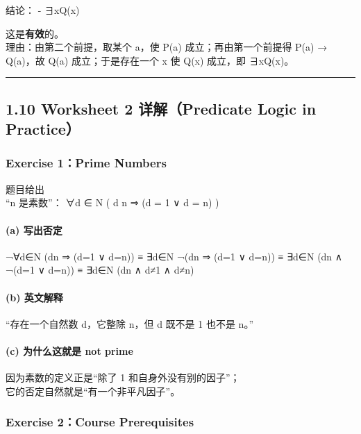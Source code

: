 \documentclass[
  11pt,
]{article}
\begin{document}
结论： - ∃xQ(x)

这是\textbf{有效}的。\\
理由：由第二个前提，取某个 a，使 P(a) 成立；再由第一个前提得 P(a) →
Q(a)，故 Q(a) 成立；于是存在一个 x 使 Q(x) 成立，即 ∃xQ(x)。

\begin{center}\rule{0.5\linewidth}{0.5pt}\end{center}

\subsection{1.10 Worksheet 2 详解（Predicate Logic in
Practice）}\label{worksheet-2-ux8be6ux89e3predicate-logic-in-practice}

\subsubsection{Exercise 1：Prime Numbers}\label{exercise-1prime-numbers}

题目给出\\
``n 是素数''： ∀d ∈ N ( d \textbar{} n ⇒ (d = 1 ∨ d = n) )

\paragraph{(a) 写出否定}\label{a-ux5199ux51faux5426ux5b9a}

¬∀d∈N (d\textbar n ⇒ (d=1 ∨ d=n)) ≡ ∃d∈N ¬(d\textbar n ⇒ (d=1 ∨ d=n)) ≡
∃d∈N (d\textbar n ∧ ¬(d=1 ∨ d=n)) ≡ ∃d∈N (d\textbar n ∧ d≠1 ∧ d≠n)

\paragraph{(b) 英文解释}\label{b-ux82f1ux6587ux89e3ux91ca}

``存在一个自然数 d，它整除 n，但 d 既不是 1 也不是 n。''

\paragraph{(c) 为什么这就是 not
prime}\label{c-ux4e3aux4ec0ux4e48ux8fd9ux5c31ux662f-not-prime}

因为素数的定义正是``除了 1 和自身外没有别的因子''；\\
它的否定自然就是``有一个非平凡因子''。

\subsubsection{Exercise 2：Course
Prerequisites}\label{exercise-2course-prerequisites}
\end{document}
